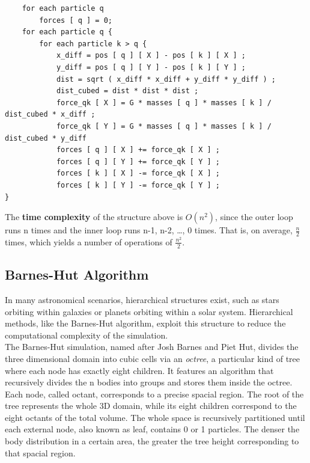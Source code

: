 \documentclass{article}
\begin{document}
\begin{boxA}
\begin{verbatim}
    for each particle q
        forces [ q ] = 0;
    for each particle q {
        for each particle k > q {
            x_diff = pos [ q ] [ X ] - pos [ k ] [ X ] ;
            y_diff = pos [ q ] [ Y ] - pos [ k ] [ Y ] ;
            dist = sqrt ( x_diff * x_diff + y_diff * y_diff ) ;
            dist_cubed = dist * dist * dist ;
            force_qk [ X ] = G * masses [ q ] * masses [ k ] / dist_cubed * x_diff ;
            force_qk [ Y ] = G * masses [ q ] * masses [ k ] / dist_cubed * y_diff
            forces [ q ] [ X ] += force_qk [ X ] ;
            forces [ q ] [ Y ] += force_qk [ Y ] ;
            forces [ k ] [ X ] -= force_qk [ X ] ;
            forces [ k ] [ Y ] -= force_qk [ Y ] ;
}
\end{verbatim}
\end{boxA}

\noindent The \textbf{time complexity} of the structure above is $O(n^2)$, since the outer loop runs n times and the inner loop runs n-1, n-2, \dots, 0 times. That is, on average, $\frac{n}{2}$ times, which yields a number of operations of  $\frac{n^2}{2}$. \\

\subsection{Barnes-Hut Algorithm}
In many astronomical scenarios, hierarchical structures exist, such as stars orbiting within galaxies or planets orbiting within a solar system. Hierarchical methods, like the Barnes-Hut algorithm, exploit this structure to reduce the computational complexity of the simulation. \\

The Barnes-Hut simulation, named after Josh Barnes and Piet Hut, divides the three dimensional domain into cubic cells via an \textit{octree}, a particular kind of tree where each node has exactly eight children. It features an algorithm that recursively divides the n bodies into groups and stores them inside the octree. Each node, called octant, corresponds to a precise spacial region. The root of the tree represents the whole 3D domain, while its eight children correspond to the eight octants of the total volume. The whole space is recursively partitioned until each external node, also known as leaf, contains 0 or 1 particles. The denser the body distribution in a certain area, the greater the tree height corresponding to that spacial region. \\
\end{document}

